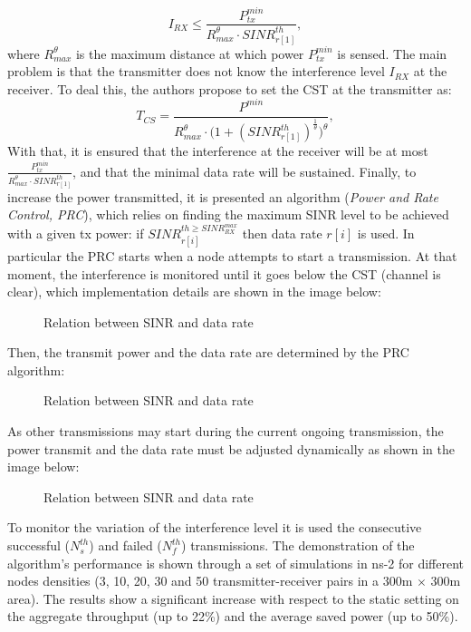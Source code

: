 \documentclass[12pt, a4paper,twoside]{tesi_upf}
\begin{document}
			\begin{equation}
			I_{RX} \leq \frac{P^{min}_{tx}}{R^{\theta}_{max} \cdot SINR_{r[1]}^{th}},
			\end{equation}
			where $R^{\theta}_{max}$ is the maximum distance at which power $P^{min}_{tx}$ is sensed. The main problem is that the transmitter does not know the interference level $I_{RX}$ at the receiver. To deal this, the authors propose to set the CST at the transmitter as:
			\begin{equation}
			T_{CS}=\frac{P^{min}}{R^{\theta}_{max} \cdot \bigg( 1+(SINR_{r[1]}^{th})^{\frac{1}{\theta}} \bigg)^\theta},
			\end{equation}
			With that, it is ensured that the interference at the receiver will be at most $\frac{P^{min}_{tx}}{R^{\theta}_{max} \cdot SINR_{r[1]}^{th}}$, and that the minimal data rate will be sustained. Finally, to increase the power transmitted, it is presented an algorithm (\textit{Power and Rate Control, PRC}), which relies on finding the maximum SINR level to be achieved with a given tx power: if $SINR_{r[i]}^{th \geq SINR^{max}_{RX}}$ then data rate $r[i]$ is used. In particular the PRC starts when a node attempts to start a transmission. At that moment, the interference is monitored until it goes below the CST (channel is clear), which implementation details are shown in the image below:	
			\begin{figure}[h!]
				\centering
				\caption{Relation between SINR and data rate}
				\label{fig:data_rate_table}
			\end{figure}	
			Then, the transmit power and the data rate are determined by the PRC algorithm:	
			\begin{figure}[h!]
				\centering
				\caption{Relation between SINR and data rate}
				\label{fig:data_rate_table}
			\end{figure}	
			As other transmissions may start during the current ongoing transmission, the power transmit and the data rate must be adjusted dynamically as shown in the image below:	
			\begin{figure}[h!]
				\centering
				\caption{Relation between SINR and data rate}
				\label{fig:data_rate_table}
			\end{figure}	
			To monitor the variation of the interference level it is used the consecutive successful ($N^{th}_s$) and failed ($N^{th}_f$) transmissions. The demonstration of the algorithm's performance is shown through a set of simulations in ns-2 for different nodes densities (3, 10, 20, 30 and 50 transmitter-receiver pairs in a 300m $\times$ 300m area). The results show a significant increase with respect to the static setting on the aggregate throughput (up to 22\%) and the average saved power (up to 50\%).
			
\end{document}
